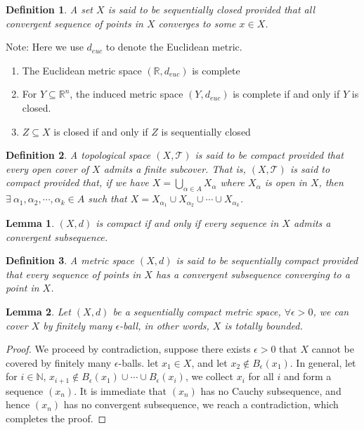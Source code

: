 \documentclass[11pt,oneside]{book}
\theoremstyle{break}
\theoremstyle{break}
\newtheorem{lem}{Lemma}[thm]
\newtheorem{defn}{Definition}[corL]
\newcommand{\R}{\mathbb{R}}
\newcommand{\N}{\mathbb{N}}
\newcommand{\T}{\mathcal{T}}
\newcommand{\note}{\color{red}Note: \color{black}}
\begin{document}
\begin{defn}
A set $X$ is said to be sequentially closed provided that all convergent sequence of points in $X$ converges to some $x \in X$.
\end{defn}

\note Here we use $d_{euc}$ to denote the Euclidean metric.
\begin{enumerate}[topsep=3pt,itemsep=-1ex,partopsep=1ex,parsep=1ex]
\item The Euclidean metric space $(\R,d_{euc})$ is complete
\item For $Y \subseteq \R^n$, the induced metric space $(Y,d_{euc})$ is complete if and only if $Y$ is closed.
\item $Z \subseteq X$ is closed if and only if $Z$ is sequentially closed 
\end{enumerate}

\begin{defn}
A topological space $(X,\T)$ is said to be compact provided that every open cover of $X$ admits a finite subcover. That is, $(X,\T)$ is said to compact provided that, if we have $X = \bigcup_{\alpha \in A} X_{\alpha}$ where $X_\alpha$ is open in $X$, then $\exists\ \alpha_1,\alpha_2,\cdots,\alpha_k \in A$ such that $X =  X_{\alpha_1}\cup X_{\alpha_2}\cup\cdots\cup X_{\alpha_k}$.
\end{defn}

\begin{lem}
$(X,d)$ is compact if and only if every sequence in $X$ admits a convergent subsequence. \end{lem}

\begin{defn}
A metric space $(X,d)$ is said to be sequentially compact provided that every sequence of points in $X$ has a convergent subsequence converging to a point in $X$.
\end{defn}

\begin{lem}
Let $(X,d)$ be a sequentially compact metric space, $\forall \epsilon >0$, we can cover $X$ by finitely many $\epsilon$-ball, in other words, $X$ is totally bounded.
\end{lem}
\begin{proof}
We proceed by contradiction, suppose there exists $\epsilon >0$ that $X$ cannot be covered by finitely many $\epsilon$-balls. let $x_1 \in X$, and let $x_2\notin B_\epsilon (x_1)$. In general, let for $i \in \N$, $x_{i+1}\notin B_\epsilon (x_1)\cup\cdots\cup B_\epsilon (x_i)$, we collect $x_i$ for all $i$ and form a sequence $(x_n)$. It is immediate that $(x_n)$ has no Cauchy subsequence, and hence $(x_n)$ has no convergent subsequence, we reach a contradiction, which completes the proof.
\end{proof}
\end{document}
